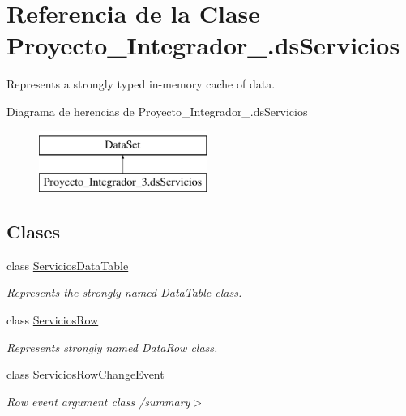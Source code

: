 \hypertarget{class_proyecto___integrador__3_1_1ds_servicios}{\section{Referencia de la Clase Proyecto\-\_\-\-Integrador\-\_.\-ds\-Servicios}
\label{class_proyecto___integrador__3_1_1ds_servicios}
}


Represents a strongly typed in-\/memory cache of data.  


Diagrama de herencias de Proyecto\-\_\-\-Integrador\-\_.\-ds\-Servicios\begin{figure}[H]
\begin{center}
\leavevmode
\includegraphics[height=2.000000cm]{da/d6b/class_proyecto___integrador__3_1_1ds_servicios}
\end{center}
\end{figure}
\subsection*{Clases}
\begin{DoxyCompactItemize}
\item 
class \hyperlink{class_proyecto___integrador__3_1_1ds_servicios_1_1_servicios_data_table}{Servicios\-Data\-Table}
\begin{DoxyCompactList}\small\item\em Represents the strongly named Data\-Table class. \end{DoxyCompactList}\item 
class \hyperlink{class_proyecto___integrador__3_1_1ds_servicios_1_1_servicios_row}{Servicios\-Row}
\begin{DoxyCompactList}\small\item\em Represents strongly named Data\-Row class. \end{DoxyCompactList}\item 
class \hyperlink{class_proyecto___integrador__3_1_1ds_servicios_1_1_servicios_row_change_event}{Servicios\-Row\-Change\-Event}
\begin{DoxyCompactList}\small\item\em Row event argument class /summary$>$ \end{DoxyCompactList}\end{DoxyCompactItemize}
